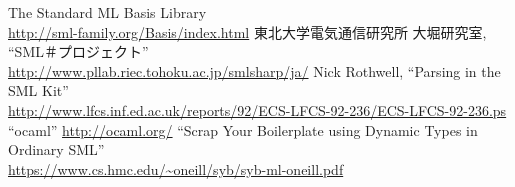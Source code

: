 \documentclass[11pt,a4paper]{article}
\begin{document}
\begin{thebibliography}{9}
   The Standard ML Basis Library \\
    \url{http://sml-family.org/Basis/index.html}
   東北大学電気通信研究所 大堀研究室, ``SML＃プロジェクト''\\
    \url{http://www.pllab.riec.tohoku.ac.jp/smlsharp/ja/}
   Nick Rothwell, ``Parsing in the SML Kit'' \\
    \url{http://www.lfcs.inf.ed.ac.uk/reports/92/ECS-LFCS-92-236/ECS-LFCS-92-236.ps}
   ``ocaml''
    \url{http://ocaml.org/}
   ``Scrap Your Boilerplate using Dynamic Types in Ordinary SML'' \\
    \url{https://www.cs.hmc.edu/~oneill/syb/syb-ml-oneill.pdf}

\end{thebibliography}
\end{document}
